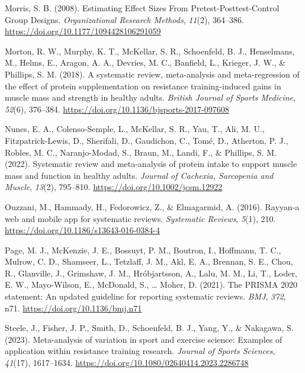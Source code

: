 \documentclass[
]{article}
\newlength{\cslhangindent}
\newenvironment{CSLReferences}[2] %
 {\begin{list}{}{%
  \setlength{\itemindent}{0pt}
  \setlength{\leftmargin}{0pt}
  \setlength{\parsep}{0pt}
  \ifodd #1
   \setlength{\leftmargin}{\cslhangindent}
   \setlength{\itemindent}{-1\cslhangindent}
  \fi
  \setlength{\itemsep}{#2\baselineskip}}}
 {\end{list}}
\begin{document}
\begin{CSLReferences}{1}{0}
Morris, S. B. (2008). Estimating {Effect Sizes From
Pretest-Posttest-Control Group Designs}. \emph{Organizational Research
Methods}, \emph{11}(2), 364--386.
\url{https://doi.org/10.1177/1094428106291059}

Morton, R. W., Murphy, K. T., McKellar, S. R., Schoenfeld, B. J.,
Henselmans, M., Helms, E., Aragon, A. A., Devries, M. C., Banfield, L.,
Krieger, J. W., \& Phillips, S. M. (2018). A systematic review,
meta-analysis and meta-regression of the effect of protein
supplementation on resistance training-induced gains in muscle mass and
strength in healthy adults. \emph{British Journal of Sports Medicine},
\emph{52}(6), 376--384.
\url{https://doi.org/10.1136/bjsports-2017-097608}

Nunes, E. A., Colenso-Semple, L., McKellar, S. R., Yau, T., Ali, M. U.,
Fitzpatrick-Lewis, D., Sherifali, D., Gaudichon, C., Tomé, D., Atherton,
P. J., Robles, M. C., Naranjo-Modad, S., Braun, M., Landi, F., \&
Phillips, S. M. (2022). Systematic review and meta-analysis of protein
intake to support muscle mass and function in healthy adults.
\emph{Journal of Cachexia, Sarcopenia and Muscle}, \emph{13}(2),
795--810. \url{https://doi.org/10.1002/jcsm.12922}

Ouzzani, M., Hammady, H., Fedorowicz, Z., \& Elmagarmid, A. (2016).
Rayyan-a web and mobile app for systematic reviews. \emph{Systematic
Reviews}, \emph{5}(1), 210.
\url{https://doi.org/10.1186/s13643-016-0384-4}

Page, M. J., McKenzie, J. E., Bossuyt, P. M., Boutron, I., Hoffmann, T.
C., Mulrow, C. D., Shamseer, L., Tetzlaff, J. M., Akl, E. A., Brennan,
S. E., Chou, R., Glanville, J., Grimshaw, J. M., Hróbjartsson, A., Lalu,
M. M., Li, T., Loder, E. W., Mayo-Wilson, E., McDonald, S., \ldots{}
Moher, D. (2021). The {PRISMA} 2020 statement: An updated guideline for
reporting systematic reviews. \emph{BMJ}, \emph{372}, n71.
\url{https://doi.org/10.1136/bmj.n71}

Steele, J., Fisher, J. P., Smith, D., Schoenfeld, B. J., Yang, Y., \&
Nakagawa, S. (2023). Meta-analysis of variation in sport and exercise
science: {Examples} of application within resistance training research.
\emph{Journal of Sports Sciences}, \emph{41}(17), 1617--1634.
\url{https://doi.org/10.1080/02640414.2023.2286748}


\end{CSLReferences}
\end{document}

